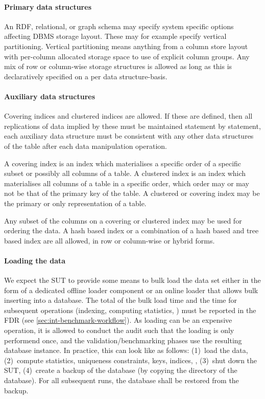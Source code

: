 \paragraph{Primary data structures}
An RDF, relational, or graph schema may specify system specific options affecting DBMS storage layout. These may for example specify vertical partitioning. Vertical partitioning means anything from a column store layout with per-column allocated storage space to use of explicit column groups. Any mix of row or column-wise storage structures is allowed as long as this is declaratively specified on a per data structure-basis.

\paragraph{Auxiliary data structures}
Covering indices and clustered indices are allowed. If these are defined, then all replications of data implied by these must be maintained statement by statement, \ie each auxiliary data structure must be consistent with any other data structures of the table after each data manipulation operation.

A covering index is an index which materialises a specific order of a specific subset or possibly all columns of a table. 
A clustered index is an index which materialises all columns of a table in a specific order, which order may or may not be that of the primary key of the table. A clustered or covering index may be the primary or only representation of a table.

Any subset of the columns on a covering or clustered index may be used for ordering the data. A hash based index or a combination of a hash based and tree based index are all allowed, in row or column-wise or hybrid forms.

\paragraph{Loading the data}

We expect the SUT to provide some means to bulk load the data set either in the form of a dedicated offline loader component or an online loader that allows bulk inserting into a database.
The total of the bulk load time and the time for subsequent operations (indexing, computing statistics, \etc) must be reported in the FDR (see \autoref{sec:int-benchmark-workflow}).
As loading can be an expensive operation, it is allowed to conduct the audit such that the loading is only performend once, and the validation/benchmarking phases use the resulting database instance.
In practice, this can look like as follows:
(1)~load the data,
(2)~compute statistics, uniqueness constraints, keys, indices, \etc,
(3)~shut down the SUT,
(4)~create a backup of the database (\eg by copying the directory of the database).
For all subsequent runs, the database shall be restored from the backup.

